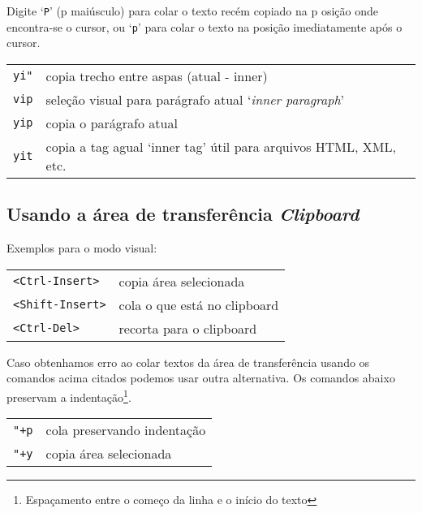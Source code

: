 Digite `{\tt P}' (p maiúsculo) para colar o texto recém copiado na p
osição onde encontra-se o cursor, ou `{\tt p}' para colar o texto na posição 
imediatamente após o cursor.

\begin{table}[htb]\begin{center} \begin{tabular}{ll} \hline
     \verb|yi"| & copia trecho entre aspas (atual - inner) \\
     \verb|vip| & seleção visual para parágrafo atual `\textit{inner paragraph}'\\
     \verb|yip| & copia o parágrafo atual\\
     \verb|yit| & copia a tag agual `inner tag' útil para arquivos HTML, XML, etc.\\
\hline \end{tabular}\end{center}\end{table}

\subsection{Usando a área de transferência \textit{Clipboard}}

Exemplos para o modo visual:

\begin{table}[htb]\begin{center} \begin{tabular}{ll} \hline
     \verb|<Ctrl-Insert>| & copia área selecionada \\
     \verb|<Shift-Insert>| & cola o que está no clipboard\\
     \verb|<Ctrl-Del>| & recorta para o clipboard\\
\hline \end{tabular}\end{center}\end{table}

Caso obtenhamos erro ao colar textos da área de transferência usando os
comandos acima citados podemos usar outra alternativa.  Os comandos abaixo
preservam a indentação\footnote{Espaçamento entre o começo da linha e o início
do texto}.

\begin{table}[htb]\begin{center} \begin{tabular}{ll} \hline
     \verb|"+p| & cola preservando indentação\\
     \verb|"+y| & copia área selecionada\\
\hline \end{tabular}\end{center}\end{table}

